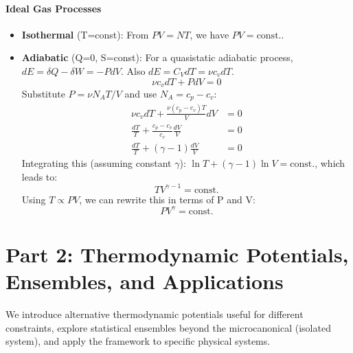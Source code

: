 \documentclass[10pt, letterpaper]{article}
\newcommand{\const}{\text{const.}}
\begin{document}
\subsection{Ideal Gas Processes}
\begin{itemize}
    \item \textbf{Isothermal} (T=const): From $PV=NT$, we have $PV = \const$.
    \item \textbf{Adiabatic} (Q=0, S=const): For a quasistatic adiabatic process, $dE = \delta Q - \delta W = -P dV$. Also $dE = C_V dT = \nu c_v dT$.
        \begin{equation*}
            \nu c_v dT + P dV = 0
        \end{equation*}
        Substitute $P = \nu N_A T / V$ and use $N_A = c_p - c_v$:
        \begin{align*}
            \nu c_v dT + \frac{\nu (c_p - c_v) T}{V} dV &= 0 \\
            \frac{dT}{T} + \frac{c_p - c_v}{c_v} \frac{dV}{V} &= 0 \\
            \frac{dT}{T} + (\gamma - 1) \frac{dV}{V} &= 0
        \end{align*}
        Integrating this (assuming constant $\gamma$): $\ln T + (\gamma - 1) \ln V = \const$, which leads to:
        \begin{equation}
            T V^{\gamma-1} = \const
        \end{equation}
        Using $T \propto PV$, we can rewrite this in terms of P and V:
        \begin{equation}
            P V^{\gamma} = \const
        \end{equation}
\end{itemize}

\part*{Part 2: Thermodynamic Potentials, Ensembles, and Applications}
We introduce alternative thermodynamic potentials useful for different constraints, explore statistical ensembles beyond the microcanonical (isolated system), and apply the framework to specific physical systems.
\end{document}
